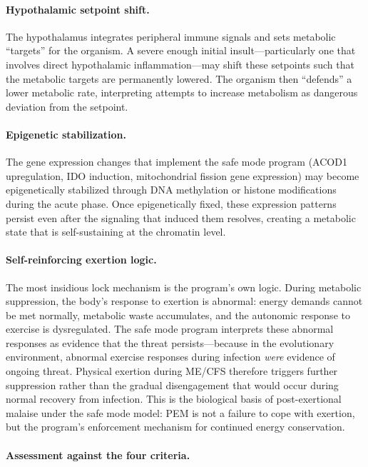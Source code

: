 \paragraph{Hypothalamic setpoint shift.} The hypothalamus integrates peripheral immune signals and sets metabolic ``targets'' for the organism. A severe enough initial insult---particularly one that involves direct hypothalamic inflammation---may shift these setpoints such that the metabolic targets are permanently lowered. The organism then ``defends'' a lower metabolic rate, interpreting attempts to increase metabolism as dangerous deviation from the setpoint.

\paragraph{Epigenetic stabilization.} The gene expression changes that implement the safe mode program (ACOD1 upregulation, IDO induction, mitochondrial fission gene expression) may become epigenetically stabilized through DNA methylation or histone modifications during the acute phase. Once epigenetically fixed, these expression patterns persist even after the signaling that induced them resolves, creating a metabolic state that is self-sustaining at the chromatin level.

\paragraph{Self-reinforcing exertion logic.} The most insidious lock mechanism is the program's own logic. During metabolic suppression, the body's response to exertion is abnormal: energy demands cannot be met normally, metabolic waste accumulates, and the autonomic response to exercise is dysregulated. The safe mode program interprets these abnormal responses as evidence that the threat persists---because in the evolutionary environment, abnormal exercise responses during infection \emph{were} evidence of ongoing threat. Physical exertion during ME/CFS therefore triggers further suppression rather than the gradual disengagement that would occur during normal recovery from infection. This is the biological basis of post-exertional malaise under the safe mode model: PEM is not a failure to cope with exertion, but the program's enforcement mechanism for continued energy conservation.

\paragraph{Assessment against the four criteria.}

